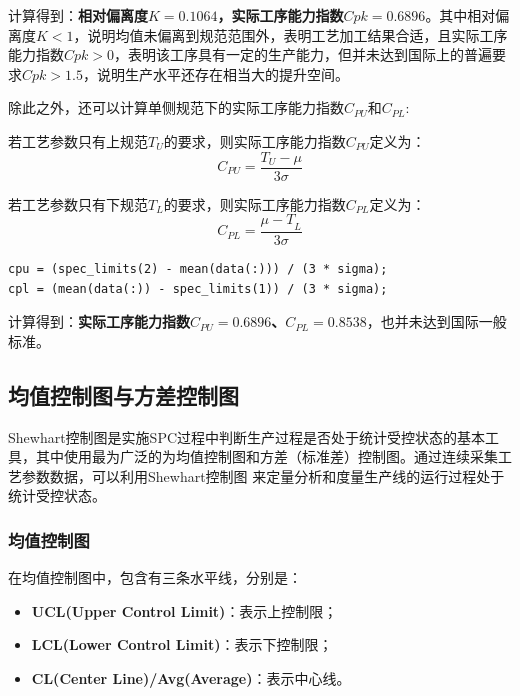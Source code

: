 \documentclass[12pt]{article}  %
\begin{document}
计算得到：\textbf{相对偏离度$K=0.1064$，实际工序能力指数$Cpk=0.6896$}。其中相对偏离度$K<1$，说明均值未偏离到规范范围外，表明工艺加工结果合适，且实际工序能力指数$Cpk>0$，表明该工序具有一定的生产能力，但并未达到国际上的普遍要求$Cpk>1.5$，说明生产水平还存在相当大的提升空间。

除此之外，还可以计算单侧规范下的实际工序能力指数$C_{PU}$和$C_{PL}$:

若工艺参数只有上规范$T_U$的要求，则实际工序能力指数$C_{PU}$定义为：
\begin{equation}
	C_{PU}=\frac{T_U-\mu}{3\sigma}
\end{equation}

若工艺参数只有下规范$T_L$的要求，则实际工序能力指数$C_{PL}$定义为：
\begin{equation}
	C_{PL}=\frac{{\mu-T}_L}{3\sigma}
\end{equation}

\begin{lstlisting}
cpu = (spec_limits(2) - mean(data(:))) / (3 * sigma);
cpl = (mean(data(:)) - spec_limits(1)) / (3 * sigma);
\end{lstlisting}

计算得到：\textbf{实际工序能力指数$C_{PU}=0.6896$、$C_{PL}=0.8538$}，也并未达到国际一般标准。

\subsection{均值控制图与方差控制图}

Shewhart控制图是实施SPC过程中判断生产过程是否处于统计受控状态的基本工具，其中使用最为广泛的为均值控制图和方差（标准差）控制图。通过连续采集工艺参数数据，可以利用Shewhart控制图
来定量分析和度量生产线的运行过程处于统计受控状态。


\subsubsection{均值控制图}
在均值控制图中，包含有三条水平线，分别是：
\begin{itemize}
	\setlength{\parsep}{0ex} %
	\setlength{\topsep}{2ex} %
	\setlength{\itemsep}{1ex} %
	\item \textbf{UCL(Upper Control Limit)}：表示上控制限；
	\item \textbf{LCL(Lower Control Limit)}：表示下控制限；
	\item \textbf{CL(Center Line)/Avg(Average)}：表示中心线。	
\end{itemize}
\end{document}
